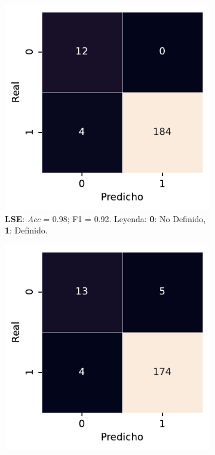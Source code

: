 \begin{figure}[htbp]
\begin{subfigure}[t]{0.3\textwidth}
    \end{subfigure}  
    \begin{subfigure}[t]{0.3\textwidth}
        \includegraphics[width=\textwidth]{figures/5_experiments/single-lse-cm.pdf}
        \caption{\textbf{LSE}: \textit{Acc} = 0.98; F1 = 0.92. Leyenda: \textbf{0}: No Definido, \textbf{1}: Definido.}
        \label{fig5:LSE_confusion_matrix}
    \end{subfigure}  
    \begin{subfigure}[t]{0.3\textwidth}
        \includegraphics[width=\textwidth]{figures/5_experiments/multi-use-cm.pdf}

\end{subfigure}
\end{figure}
